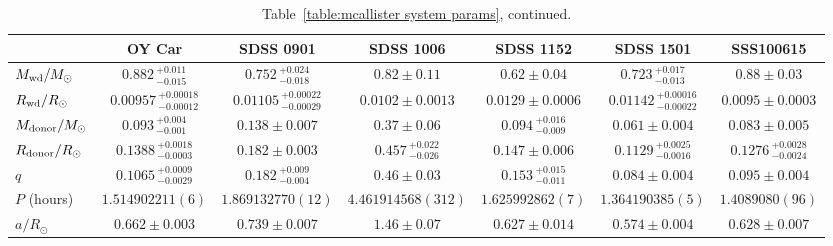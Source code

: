 \begin{landscape}
    \begin{table}
        \caption{Table~\ref{table:mcallister system params}, continued.}
        \label{table:mcallister system params cont 1}
        \begin{tabular}{lcccccc}
            \hline
            ~                           & \textbf{OY Car}                   & \textbf{SDSS 0901}                    & \textbf{SDSS 1006}            & \textbf{SDSS 1152}            & \textbf{SDSS 1501}                                        & \textbf{SSS100615}                \\
            \hline
            \hline
            $M_{\rm wd}/M_{\odot}$      & $0.882\,^{+0.011}_{-0.015}$       & $0.752\,^{+0.024}_{-0.018}$           & $0.82\pm0.11$                 & $0.62\pm0.04$                 & $0.723\,^{+0.017}_{-0.013}$                               & $0.88\pm0.03$                     \\
            $R_{\rm wd}/R_{\odot}$      & $0.00957\,^{+0.00018}_{-0.00012}$ & $0.01105\,^{+0.00022}_{-0.00029}$     & $0.0102\pm0.0013$             & $0.0129\pm0.0006$             & $0.01142\,^{+0.00016}_{-0.00022}$                         & $0.0095\pm0.0003$                 \\
            $M_{\rm donor}/M_{\odot}$   & $0.093\,^{+0.004}_{-0.001}$       & $0.138\pm0.007$                       & $0.37\pm0.06$                 & $0.094\,^{+0.016}_{-0.009}$   & $0.061\pm0.004$                                           & $0.083\pm0.005$                   \\
            $R_{\rm donor}/R_{\odot}$   & $0.1388\,^{+0.0018}_{-0.0003}$    & $0.182\pm0.003$                       & $0.457\,^{+0.022}_{-0.026}$   & $0.147\pm0.006$               & $0.1129\,^{+0.0025}_{-0.0016}$                            & $0.1276\,^{+0.0028}_{-0.0024}$    \\
            $q$                         & $0.1065\,^{+0.0009}_{-0.0029}$    & $0.182\,^{+0.009}_{-0.004}$           & $0.46\pm0.03$                 & $0.153\,^{+0.015}_{-0.011}$   & $0.084\pm0.004$                                           & $0.095\pm0.004$                   \\
            \hline
            $P$ (hours)                  & $1.514902211(6)$                  & $1.869132770(12)$                     & $4.461914568(312)$            & $1.625992862(7)$              & $1.364190385(5)$                                          & $1.4089080(96)$                   \\
            $a/R_{\odot}$               & $0.662\pm0.003$                   & $0.739\pm0.007$                       & $1.46\pm0.07$                 & $0.627\pm0.014$               & $0.574\pm0.004$                                           & $0.628\pm0.007$                   \\

\end{tabular}
\end{table}
\end{landscape}
